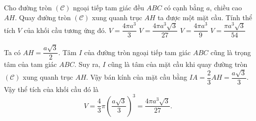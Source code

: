 \begin{ex}%
 Cho đường tròn $(\mathscr{C})$ ngoại tiếp tam giác đều $ABC$ có cạnh bằng $a$, chiều cao $AH$. Quay đường tròn $(\mathscr{C})$ xung quanh trục $AH$ ta được một mặt cầu. Tính thể tích $V$ của khối cầu tương ứng đó.
 \choice
  {$V=\dfrac{4\pi a^3}{3}$}
  {\True $V=\dfrac{4\pi a^3\sqrt{3}}{27}$}
  {$V=\dfrac{4\pi a^3}{9}$}
  {$V=\dfrac{\pi a^3\sqrt{3}}{54}$}
 \loigiai
  {
  \immini
  {
  Ta có $AH = \dfrac{a\sqrt{3}}{2}$. Tâm $I$ của đường tròn ngoại tiếp tam giác $ABC$ cũng là trọng tâm của tam giác $ABC$. Suy ra, $I$ cũng là tâm của mặt cầu khi quay đường tròn $(\mathscr{C})$ xung quanh trục $AH$. Vậy bán kính của mặt cầu bằng $IA = \dfrac{2}{3}AH = \dfrac{a\sqrt{3}}{3}$.\\
  Vậy thể tích của khối cầu đó là $$V = \dfrac{4}{3}\pi \left(\dfrac{a\sqrt{3}}{3}\right)^3 = \dfrac{4\pi a^3\sqrt{3}}{27}.$$
  }
  {
  }
  }
\end{ex}


